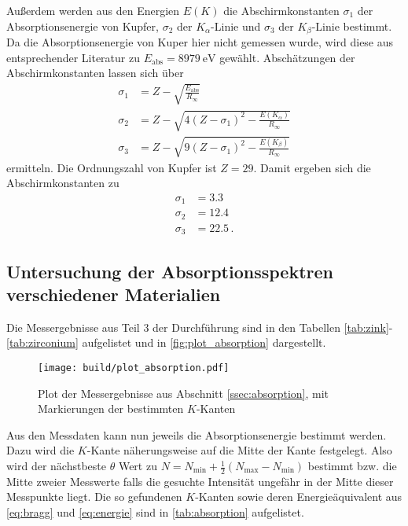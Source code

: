 Außerdem werden aus den Energien $E(K)$ die Abschirmkonstanten $\sigma_1$ der Absorptionsenergie von Kupfer, $\sigma_2$ der $K_\alpha$-Linie und $\sigma_3$ der $K_\beta$-Linie bestimmt.
Da die Absorptionsenergie von Kuper hier nicht gemessen wurde, wird diese aus entsprechender Literatur zu $E_\text{abs}=\SI{8979}{\electronvolt}$ gewählt.\cite{absorption}
Abschätzungen der Abschirmkonstanten lassen sich über 
\begin{align}
    \sigma_1 &= Z - \sqrt{\frac{E_\text{abs}}{R_\infty}} \\
    \sigma_2 &= Z - \sqrt{4(Z-\sigma_1)^2-\frac{E(K_\alpha)}{R_\infty}} \\
    \sigma_3 &= Z - \sqrt{9(Z-\sigma_1)^2-\frac{E(K_\beta)}{R_\infty}}
\end{align}
ermitteln.\cite[Gleichungen (8),(9),(10)]{V602} 
Die Ordnungszahl von Kupfer ist $Z=29$.
Damit ergeben sich die Abschirmkonstanten zu
\begin{align*}
    \sigma_1 &= \num{3.3} \\
    \sigma_2 &= \num{12.4} \\
    \sigma_3 &= \num{22.5} \, .
\end{align*}



\subsection{Untersuchung der Absorptionsspektren verschiedener Materialien}
\label{ssec:absorption_auswertung}

Die Messergebnisse aus Teil 3 der Durchführung sind in den Tabellen \ref{tab:zink}-\ref{tab:zirconium} aufgelistet und in \autoref{fig:plot_absorption} dargestellt.

\begin{figure}
    \centering
    \texttt{[image: build/plot\_absorption.pdf]}
    \caption{Plot der Messergebnisse aus Abschnitt \ref{ssec:absorption}, mit Markierungen der bestimmten $K$-Kanten}
    \label{fig:plot_absorption}
\end{figure}

Aus den Messdaten kann nun jeweils die Absorptionsenergie bestimmt werden.
Dazu wird die $K$-Kante näherungsweise auf die Mitte der Kante festgelegt.
Also wird der nächstbeste $\theta$ Wert zu $N=N_\text{min} + \frac{1}{2}(N_\text{max}-N_\text{min})$ bestimmt bzw. die Mitte zweier Messwerte falls die gesuchte Intensität ungefähr in der Mitte dieser Messpunkte liegt.
Die so gefundenen $K$-Kanten sowie deren Energieäquivalent aus \autoref{eq:bragg} und \ref{eq:energie} sind in \autoref{tab:absorption} aufgelistet.

